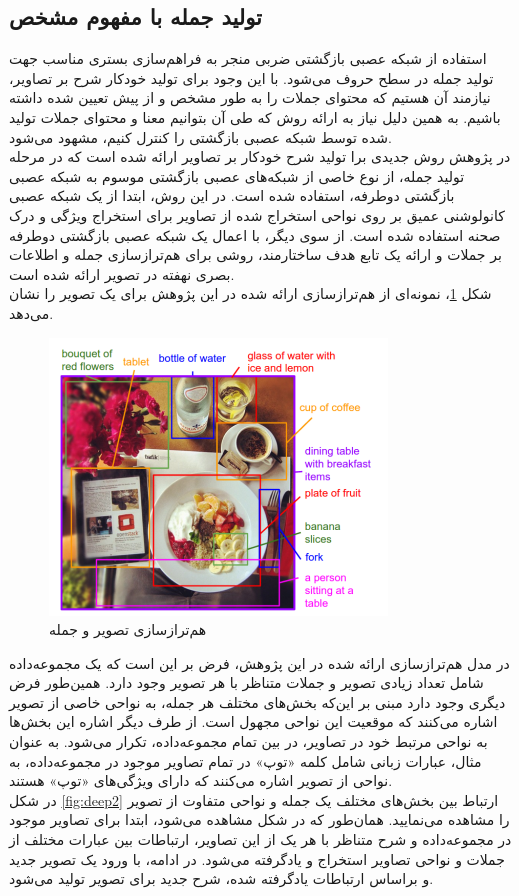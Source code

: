  
 
 
 
 \subsection{تولید جمله با مفهوم مشخص}
استفاده از شبکه عصبی بازگشتی ضربی منجر به فراهم‌سازی بستری مناسب جهت تولید جمله در سطح حروف می‌شود. با این وجود برای تولید خودکار شرح بر تصاویر، نیازمند آن‌ هستیم که محتوای جملات را به طور مشخص و از پیش تعیین شده داشته باشیم. به همین دلیل نیاز به ارائه روش که طی آن بتوانیم معنا و محتوای جملات تولید شده توسط شبکه عصبی بازگشتی را کنترل کنیم، مشهود می‌شود.
\\
در پژوهش \cite{karpathy2015deep} روش جدیدی برا تولید شرح خودکار بر تصاویر ارائه شده است که در مرحله تولید جمله، از نوع خاصی از شبکه‌های عصبی بازگشتی موسوم به شبکه عصبی بازگشتی دوطرفه، استفاده  شده است. در این روش، ابتدا از یک شبکه عصبی کانولوشنی عمیق بر روی نواحی استخراج شده از تصاویر برای استخراج ویژگی و درک صحنه استفاده شده است. از سوی دیگر، با اعمال یک شبکه عصبی بازگشتی دوطرفه بر جملات و ارائه یک تابع هدف ساختارمند، روشی برای هم‌ترازسازی جمله و اطلاعات بصری نهفته در تصویر ارائه شده است.
\\

شکل \ref{fig:deep1}، نمونه‌ای از هم‌ترازسازی ارائه شده در این پژوهش برای یک تصویر را نشان می‌دهد.
\begin{figure}[H]
\center
\includegraphics[scale=0.6]{Imgs/sentence_deep1.png}
\caption{هم‌ترازسازی تصویر و جمله\cite{karpathy2015deep}}
\label{fig:deep1}
\end{figure}

در مدل هم‌ترازسازی ارائه شده در این پژوهش، فرض بر این است که یک مجموعه‌داده شامل تعداد زیادی تصویر و جملات متناظر با هر تصویر وجود دارد. همین‌طور فرض دیگری وجود دارد مبنی بر این‌که بخش‌های مختلف هر جمله، به نواحی خاصی از تصویر اشاره‌ می‌کنند که موقعیت این نواحی مجهول است. از طرف دیگر اشاره این بخش‌ها به نواحی مرتبط خود در تصاویر، در بین تمام مجمو‌‌عه‌داده، تکرار می‌شود. به عنوان مثال، عبارات زبانی شامل کلمه «توپ» در تمام تصاویر موجود در مجموعه‌داده، به نواحی از تصویر اشاره می‌کنند که دارای ويژگی‌های «توپ» هستند.
\\
در شکل \ref{fig:deep2} ارتباط بین بخش‌های مختلف یک جمله و نواحی متفاوت از تصویر را مشاهده می‌نمایید. همان‌طور که در شکل مشاهده می‌شود، ابتدا برای تصاویر موجود در مجموعه‌داده و شرح متناظر با هر یک از این تصاویر، ارتباطات بین عبارات مختلف از جملات و نواحی تصاویر استخراج و یادگرفته می‌شود. در ادامه، با ورود یک  تصویر جدید و براساس ارتباطات یادگرفته شده، شرح جدید برای تصویر تولید می‌شود.

